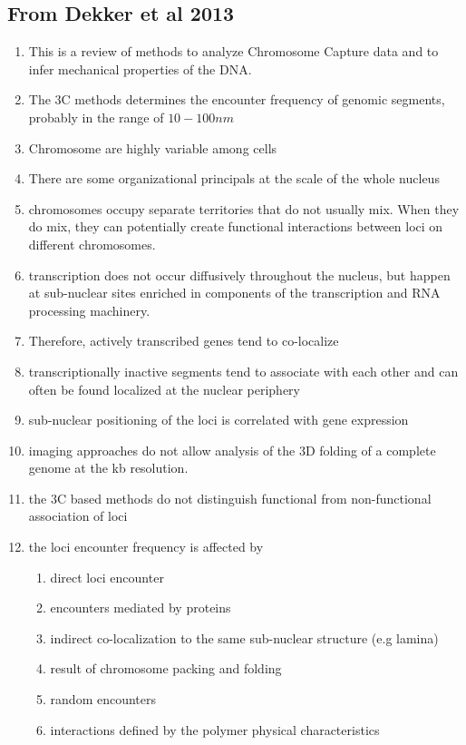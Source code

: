 \documentclass[12pt]{paper}
\begin{document}
\subsection{From Dekker et al 2013 \cite{dekker2013exploring}}
\begin{enumerate}
\item This is a review of methods to analyze Chromosome Capture data and to infer mechanical properties of the DNA.
\item The 3C methods determines the encounter frequency of genomic segments, probably in the range of $10-100nm$
\item Chromosome are highly variable among cells \cite{muller2010stable}
\item There are some organizational principals at the scale of the whole nucleus
\item chromosomes occupy separate territories that do not usually mix\cite{marshall1997interphase}. When they do mix, they can potentially create functional interactions between loci on different chromosomes. 
\item transcription does not occur diffusively throughout the nucleus, but happen at sub-nuclear sites enriched in components of the transcription and RNA processing machinery.
\item Therefore, actively transcribed genes tend to co-localize
\item transcriptionally inactive segments tend to associate with each other and can often be found localized at the nuclear periphery
\item sub-nuclear positioning of the loci is correlated with gene expression
\item imaging approaches do not allow analysis of the 3D folding of a complete genome at the kb resolution. 
\item the 3C based methods do not distinguish functional from non-functional association of loci
\item the loci encounter frequency is affected by \begin{enumerate}
\item direct loci encounter
\item encounters mediated by proteins
\item indirect co-localization to the same sub-nuclear structure (e.g lamina)
\item result of chromosome packing and folding 
\item random encounters
\item interactions defined by the polymer physical characteristics

\end{enumerate}
\end{enumerate}
\end{document}
